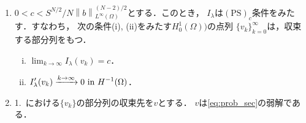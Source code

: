 \begin{lem} \label{lem:PS_c}
 \begin{enumerate}[1.] \sage
  \item  $0 < c < S^{N/2}/N\left\| b \right\|_{L^\infty(\Omega)}
         ^{(N-2)/2}$とする．このとき，
         $I_\lambda$は$(\mathrm{PS})_c$条件をみたす．すなわち，
         次の条件(i), (ii)をみたす$H_0^1(\Omega))$の点列
         $\{ v_k \}_{k = 0}^\infty$は，収束する部分列をもつ．
         \begin{enumerate}[(i)]
          \item $\displaystyle \lim_{k \to \infty} I_\lambda (v_k) = c$．
          \item $\displaystyle I^\prime_\lambda (v_k) \xrightarrow{k \to
                \infty} 0 ~\text{in}~ H^{-1}(\Omega)$．
         \end{enumerate}
  \item 1.~における$\{ v_k \}$の部分列の収束先を$v$とする．
        $v$は\ref{eq:prob_sec}の弱解である．
 \end{enumerate}
\end{lem}

